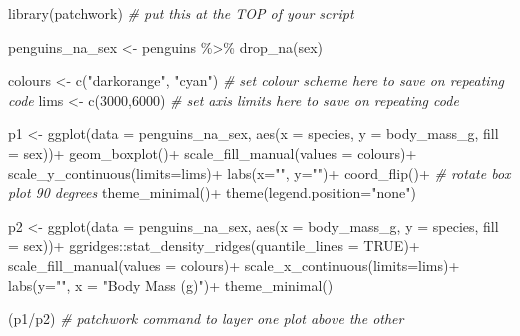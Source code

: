\documentclass[
]{book}
\newenvironment{Shaded}{\begin{snugshade}}{\end{snugshade}}
\newcommand{\AttributeTok}[1]{\textcolor[rgb]{0.77,0.63,0.00}{#1}}
\newcommand{\CommentTok}[1]{\textcolor[rgb]{0.56,0.35,0.01}{\textit{#1}}}
\newcommand{\ConstantTok}[1]{\textcolor[rgb]{0.00,0.00,0.00}{#1}}
\newcommand{\DecValTok}[1]{\textcolor[rgb]{0.00,0.00,0.81}{#1}}
\newcommand{\FunctionTok}[1]{\textcolor[rgb]{0.00,0.00,0.00}{#1}}
\newcommand{\NormalTok}[1]{#1}
\newcommand{\OtherTok}[1]{\textcolor[rgb]{0.56,0.35,0.01}{#1}}
\newcommand{\SpecialCharTok}[1]{\textcolor[rgb]{0.00,0.00,0.00}{#1}}
\newcommand{\StringTok}[1]{\textcolor[rgb]{0.31,0.60,0.02}{#1}}
\begin{document}
\begin{Shaded}
\begin{Highlighting}[]
\FunctionTok{library}\NormalTok{(patchwork) }\CommentTok{\# put this at the TOP of your script}

\NormalTok{penguins\_na\_sex }\OtherTok{\textless{}{-}}\NormalTok{ penguins }\SpecialCharTok{\%\textgreater{}\%} 
  \FunctionTok{drop\_na}\NormalTok{(sex)}

\NormalTok{colours }\OtherTok{\textless{}{-}}  \FunctionTok{c}\NormalTok{(}\StringTok{"darkorange"}\NormalTok{, }\StringTok{"cyan"}\NormalTok{) }\CommentTok{\# set colour scheme here to save on repeating code}
\NormalTok{lims }\OtherTok{\textless{}{-}} \FunctionTok{c}\NormalTok{(}\DecValTok{3000}\NormalTok{,}\DecValTok{6000}\NormalTok{) }\CommentTok{\# set axis limits here to save on repeating code}

\NormalTok{  p1 }\OtherTok{\textless{}{-}} \FunctionTok{ggplot}\NormalTok{(}\AttributeTok{data =}\NormalTok{ penguins\_na\_sex,}
    \FunctionTok{aes}\NormalTok{(}\AttributeTok{x =}\NormalTok{ species,}
             \AttributeTok{y =}\NormalTok{ body\_mass\_g,}
             \AttributeTok{fill =}\NormalTok{ sex))}\SpecialCharTok{+}
      \FunctionTok{geom\_boxplot}\NormalTok{()}\SpecialCharTok{+}
    \FunctionTok{scale\_fill\_manual}\NormalTok{(}\AttributeTok{values =}\NormalTok{ colours)}\SpecialCharTok{+}
    \FunctionTok{scale\_y\_continuous}\NormalTok{(}\AttributeTok{limits=}\NormalTok{lims)}\SpecialCharTok{+}
    \FunctionTok{labs}\NormalTok{(}\AttributeTok{x=}\StringTok{""}\NormalTok{,}
         \AttributeTok{y=}\StringTok{""}\NormalTok{)}\SpecialCharTok{+}
        \FunctionTok{coord\_flip}\NormalTok{()}\SpecialCharTok{+} \CommentTok{\# rotate box plot 90 degrees}
    \FunctionTok{theme\_minimal}\NormalTok{()}\SpecialCharTok{+}
    \FunctionTok{theme}\NormalTok{(}\AttributeTok{legend.position=}\StringTok{"none"}\NormalTok{)}

\NormalTok{  p2 }\OtherTok{\textless{}{-}} \FunctionTok{ggplot}\NormalTok{(}\AttributeTok{data =}\NormalTok{ penguins\_na\_sex,}
         \FunctionTok{aes}\NormalTok{(}\AttributeTok{x =}\NormalTok{ body\_mass\_g,}
             \AttributeTok{y =}\NormalTok{ species,}
             \AttributeTok{fill =}\NormalTok{ sex))}\SpecialCharTok{+}
\NormalTok{    ggridges}\SpecialCharTok{::}\FunctionTok{stat\_density\_ridges}\NormalTok{(}\AttributeTok{quantile\_lines =} \ConstantTok{TRUE}\NormalTok{)}\SpecialCharTok{+}
        \FunctionTok{scale\_fill\_manual}\NormalTok{(}\AttributeTok{values =}\NormalTok{ colours)}\SpecialCharTok{+}
    \FunctionTok{scale\_x\_continuous}\NormalTok{(}\AttributeTok{limits=}\NormalTok{lims)}\SpecialCharTok{+}
    \FunctionTok{labs}\NormalTok{(}\AttributeTok{y=}\StringTok{""}\NormalTok{,}
         \AttributeTok{x =} \StringTok{"Body Mass (g)"}\NormalTok{)}\SpecialCharTok{+}
    \FunctionTok{theme\_minimal}\NormalTok{()}
  
\NormalTok{  (p1}\SpecialCharTok{/}\NormalTok{p2) }\CommentTok{\# patchwork command to layer one plot above the other}
\end{Highlighting}
\end{Shaded}
\end{document}
